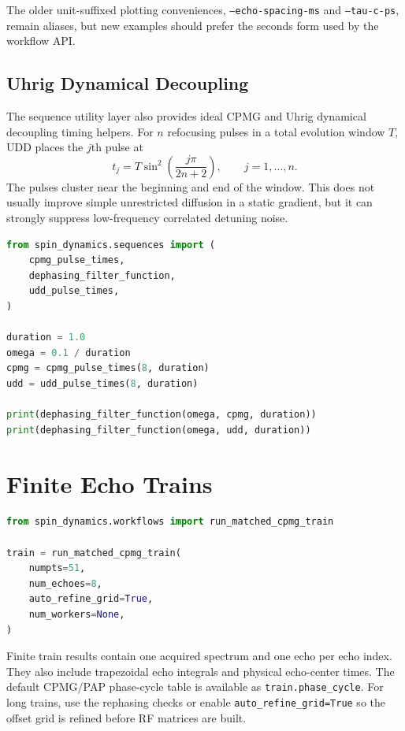 \documentclass[11pt,oneside]{report}
\newcommand{\code}[1]{\texttt{#1}}
\begin{document}
The older unit-suffixed plotting conveniences, \code{--echo-spacing-ms} and
\code{--tau-c-ps}, remain aliases, but new examples should prefer the seconds
form used by the workflow API.

\subsection{Uhrig Dynamical Decoupling}

The sequence utility layer also provides ideal CPMG and Uhrig dynamical
decoupling timing helpers. For \(n\) refocusing pulses in a total evolution
window \(T\), UDD places the \(j\)th pulse at
\[
  t_j = T\sin^2\!\left(\frac{j\pi}{2n+2}\right),\qquad j=1,\ldots,n.
\]
The pulses cluster near the beginning and end of the window. This does not
usually improve simple unrestricted diffusion in a static gradient, but it can
strongly suppress low-frequency correlated detuning noise.

\begin{lstlisting}[language=Python]
from spin_dynamics.sequences import (
    cpmg_pulse_times,
    dephasing_filter_function,
    udd_pulse_times,
)

duration = 1.0
omega = 0.1 / duration
cpmg = cpmg_pulse_times(8, duration)
udd = udd_pulse_times(8, duration)

print(dephasing_filter_function(omega, cpmg, duration))
print(dephasing_filter_function(omega, udd, duration))
\end{lstlisting}

\section{Finite Echo Trains}

\begin{lstlisting}[language=Python]
from spin_dynamics.workflows import run_matched_cpmg_train

train = run_matched_cpmg_train(
    numpts=51,
    num_echoes=8,
    auto_refine_grid=True,
    num_workers=None,
)
\end{lstlisting}

Finite train results contain one acquired spectrum and one echo per echo index.
They also include trapezoidal echo integrals and physical echo-center times.
The default CPMG/PAP phase-cycle table is available as
\code{train.phase\_cycle}.
For long trains, use the rephasing checks or enable
\code{auto\_refine\_grid=True} so the offset grid is refined before RF matrices
are built.
\end{document}
